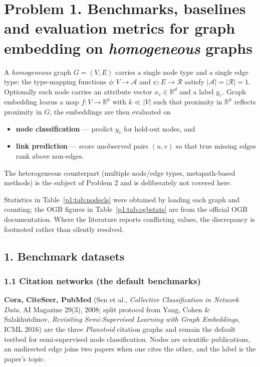 \section*{Problem 1. Benchmarks, baselines and evaluation metrics for graph
embedding on \emph{homogeneous} graphs}

\noindent
A \emph{homogeneous} graph $G=(V,E)$ carries a single node type and a single edge type:
the type-mapping functions $\phi:V\rightarrow\mathcal{A}$ and $\psi:E\rightarrow\mathcal{R}$
satisfy $|\mathcal{A}|=|\mathcal{R}|=1$. Optionally each node carries an attribute vector
$x_v\in\mathbb{R}^{d}$ and a label $y_v$. Graph embedding learns a map
$f:V\rightarrow\mathbb{R}^{k}$ with $k\ll|V|$ such that proximity in $\mathbb{R}^{k}$
reflects proximity in $G$; the embeddings are then evaluated on

\begin{itemize}[label=$\bullet$,noitemsep,topsep=2pt]
  \item \textbf{node classification} --- predict $y_v$ for held-out nodes, and
  \item \textbf{link prediction} --- score unobserved pairs $(u,v)$ so that true missing
        edges rank above non-edges.
\end{itemize}

\noindent
The heterogeneous counterpart (multiple node/edge types, metapath-based methods) is the
subject of Problem 2 and is deliberately not covered here.

\noindent
Statistics in Table~\ref{p1:tab:nodecls} were obtained by loading each graph and counting;
the OGB figures in Table~\ref{p1:tab:ogbstats} are from the official OGB documentation.
Where the literature reports conflicting values, the discrepancy is footnoted rather than
silently resolved.

\subsection*{1. Benchmark datasets}

\subsubsection*{1.1 Citation networks (the default benchmarks)}

\textbf{Cora, CiteSeer, PubMed} (Sen et al., \emph{Collective Classification in Network
Data}, AI Magazine 29(3), 2008; split protocol from Yang, Cohen \& Salakhutdinov,
\emph{Revisiting Semi-Supervised Learning with Graph Embeddings}, ICML 2016) are the three
\emph{Planetoid} citation graphs and remain the default testbed for semi-supervised node
classification. Nodes are scientific publications, an undirected edge joins two papers when
one cites the other, and the label is the paper's topic.

